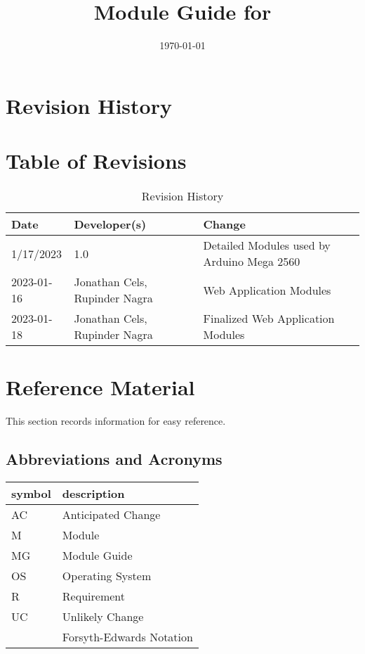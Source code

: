 \documentclass[12pt, titlepage]{article}
\begin{document}
\title{Module Guide for \progname{}} 
\author{\authname}
\date{\today}

\maketitle


\section{Revision History}

\section*{Table of Revisions}
\begin{table}[hp]
\caption{Revision History} \label{TblRevisionHistory}
\begin{tabularx}{\textwidth}{llX}
\toprule
\textbf{Date} & \textbf{Developer(s)} & \textbf{Change}\\
\midrule
1/17/2023 & 1.0 & Detailed Modules used by Arduino Mega 2560\\
2023-01-16 & Jonathan Cels, Rupinder Nagra & Web Application Modules\\
2023-01-18 & Jonathan Cels, Rupinder Nagra & Finalized Web Application Modules\\
\bottomrule
\end{tabularx}
\end{table}

\newpage

\section{Reference Material}

This section records information for easy reference.

\subsection{Abbreviations and Acronyms}

\renewcommand{\arraystretch}{1.2}
\begin{tabular}{l l} 
  \toprule		
  \textbf{symbol} & \textbf{description}\\
  \midrule 
  AC & Anticipated Change\\
  M & Module \\
  MG & Module Guide \\
  OS & Operating System \\
  R & Requirement\\
  UC & Unlikely Change \\
  \cite{FEN} & Forsyth-Edwards Notation\\
  \bottomrule
\end{tabular}\\
\end{document}
